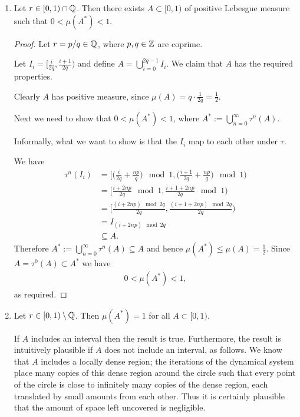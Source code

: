 \begin{enumerate}
\item
  \begin{claim*}
    Let $r \in [0, 1) \cap \mathbb{Q}$. Then there exists $A \subset [0, 1)$ of positive Lebesgue measure such that $0 < \mu(A^*) < 1$.
  \end{claim*}
  \begin{proof}
    Let $r = p/q \in \mathbb{Q}$, where $p, q \in \mathbb{Z}$ are coprime.

    Let $I_i = [\frac{i}{2q}, \frac{i+1}{2q})$ and define $A = \bigcup_{i=0}^{2q-1} I_i$. We claim that $A$ has
    the required properties.

    Clearly $A$ has positive measure, since $\mu(A) = q \cdot \frac{1}{2q} = \frac{1}{2}$.

    Next we need to show that $0 < \mu(A^*) < 1$, where $A^* := \bigcup_{n=0}^\infty \tau^n(A)$.

    Informally, what we want to show is that the $I_i$ map to each other under $\tau$.

    We have
    \begin{align*}
      \tau^n(I_i)
      &= \Big[\big(\frac{i}{2q} + \frac{np}{q}\big) \mod 1, \big(\frac{i+1}{2q} + \frac{np}{q}\big) \mod 1 \Big) \\
      &= \Big[\frac{i + 2np}{2q} \mod 1, \frac{i + 1 + 2np}{2q} \mod 1\Big) \\
      &= \Big[\frac{(i + 2np) \mod 2q}{2q}, \frac{(i + 1 + 2np) \mod 2q}{2q}\Big) \\
      &= I_{(i + 2np) \mod 2q} \\
      &\subseteq A.
    \end{align*}
    Therefore $A^* := \bigcup_{n=0}^\infty \tau^n(A) \subseteq A$ and
    hence $\mu(A^*) \leq \mu(A) = \frac{1}{2}$. Since $A = \tau^0(A) \subset A^*$ we have
    \begin{align*}
      0 < \mu(A^*) < 1,
    \end{align*}
    as required.
  \end{proof}

\item
  \begin{claim*}
    Let $r \in [0, 1) \setminus \mathbb{Q}$. Then $\mu(A^*) = 1$ for all $A \subset [0, 1)$.
  \end{claim*}

  \begin{intuition*}
    If $A$ includes an interval then the result is true. Furthermore, the result is intuitively plausible
    if $A$ does not include an interval​, as follows. We know that $A$ includes a locally dense region; the
    iterations of the dynamical system place many copies of this dense region around the circle such that every
    point of the circle is close to infinitely many copies of the dense region, each translated by small
    amounts from each other. Thus it is certainly plausible that the amount of space left uncovered is
    negligible.
  \end{intuition*}


\end{enumerate}
